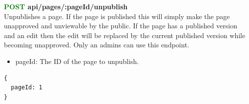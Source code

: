 \documentclass[onecolumn, draftclsnofoot,10pt, compsoc, usenames, dvipsnames]{IEEEtran}
\begin{document}
\noindent
\textbf{\textcolor{Green}{POST} api/pages/:pageId/unpublish} \\
Unpublishes a page. If the page is published this will simply make the page unapproved and unviewable by the public. If the page has a published version and an edit then the edit will be replaced by the current published version while becoming unapproved. Only an admins can use this endpoint.
\begin{itemize}
    \item pageId: The ID of the page to unpublish.
\end{itemize}
\begin{lstlisting}[caption=Example Response]
{ 
  pageId: 1
}
\end{lstlisting}
\\~\\
\end{document}
